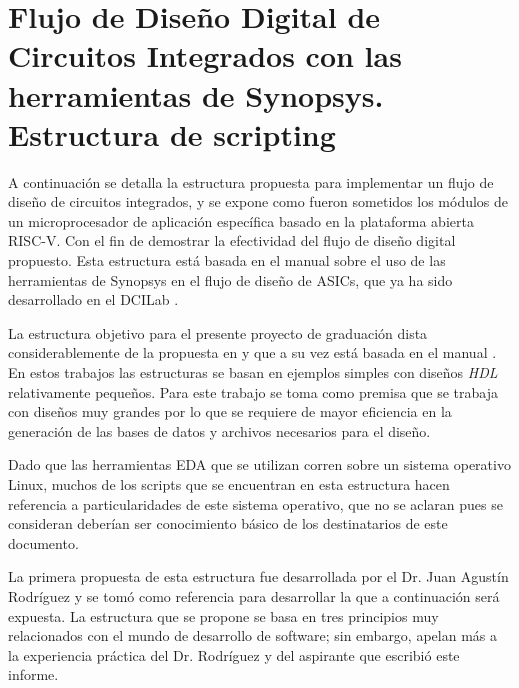 \chapter[Flujo de Diseño Digital]{Flujo de Diseño Digital de Circuitos Integrados con las herramientas de Synopsys. Estructura de scripting}
\label{ch:scripting}

A continuación se detalla la estructura propuesta para implementar un flujo de diseño de circuitos integrados, y se expone como fueron sometidos los módulos de un microprocesador de aplicación específica basado en la plataforma abierta RISC-V. Con el fin de demostrar la efectividad del flujo de diseño digital propuesto. Esta estructura está basada en el manual sobre el uso de las herramientas de Synopsys en el flujo de diseño de ASICs, que ya ha sido desarrollado en el DCILab \cite{FlujoJairo2016}.

La estructura objetivo para el presente proyecto de graduación dista considerablemente de la propuesta en \cite{FlujoJairo2016} y que a su vez está basada en el manual \cite{kommuru2009asic}. En estos trabajos las estructuras se basan en ejemplos simples con diseños \textit{HDL} relativamente pequeños. Para este trabajo se toma como premisa que se trabaja con diseños muy grandes por lo que se requiere de mayor eficiencia en la generación de las bases de datos y archivos necesarios para el diseño.

Dado que las herramientas EDA que se utilizan corren sobre un sistema operativo Linux, muchos de los scripts que se encuentran en esta estructura hacen referencia a particularidades de este sistema operativo, que no se aclaran pues se consideran deberían ser conocimiento básico de los destinatarios de este documento.

La primera propuesta de esta estructura fue desarrollada por el Dr. Juan Agustín Rodríguez y se tomó como referencia para desarrollar la que a continuación será expuesta. La estructura que se propone se basa en tres principios muy relacionados con el mundo de desarrollo de software; sin embargo, apelan más a la experiencia práctica del Dr. Rodríguez y del aspirante que escribió este informe.

